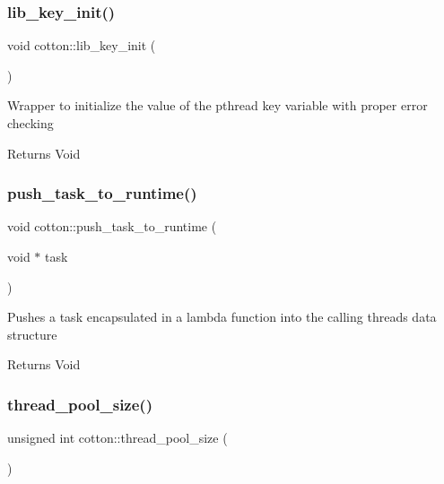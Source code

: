 \subsubsection{\texorpdfstring{lib\+\_\+key\+\_\+init()}{lib\_key\_init()}}
{\footnotesize\ttfamily void cotton\+::lib\+\_\+key\+\_\+init (\begin{DoxyParamCaption}{ }\end{DoxyParamCaption})}

Wrapper to initialize the value of the pthread key variable with proper error checking

\begin{DoxyReturn}{Returns}
Void 
\end{DoxyReturn}
\mbox{\label{cotton-runtime_8h_file_a803285410d295a5f32238ad2dfc241a5}} 
\subsubsection{\texorpdfstring{push\+\_\+task\+\_\+to\+\_\+runtime()}{push\_task\_to\_runtime()}}
{\footnotesize\ttfamily void cotton\+::push\+\_\+task\+\_\+to\+\_\+runtime (\begin{DoxyParamCaption}\item[{void $\ast$}]{task }\end{DoxyParamCaption})}

Pushes a task encapsulated in a lambda function into the calling thread\textquotesingle{}s data structure

\begin{DoxyReturn}{Returns}
Void 
\end{DoxyReturn}
\mbox{\label{cotton-runtime_8h_file_a0b32dd3b6a3d126e107d5c77ec1f4cc3}} 
\subsubsection{\texorpdfstring{thread\+\_\+pool\+\_\+size()}{thread\_pool\_size()}}
{\footnotesize\ttfamily unsigned int cotton\+::thread\+\_\+pool\+\_\+size (\begin{DoxyParamCaption}{ }\end{DoxyParamCaption})}

